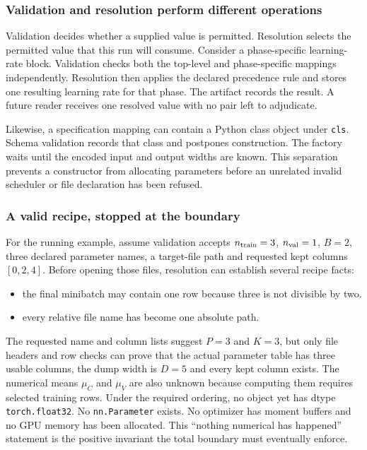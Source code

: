 \documentclass[10pt,aps,prd,twocolumn,nofootinbib]{revtex4-2}
\newcommand{\code}[1]{\texttt{#1}}
\begin{document}
\subsubsection{Validation and resolution perform different operations}

Validation decides whether a supplied value is permitted.  Resolution selects
the permitted value that this run will consume.  Consider a
phase-specific learning-rate block.  Validation checks both the top-level and
phase-specific mappings independently.  Resolution then applies the declared
precedence rule and stores one resulting learning rate for that phase.  The
artifact records the result.  A future reader receives one resolved value with
no pair left to adjudicate.

Likewise, a specification mapping can contain a Python class object under
\code{cls}.  Schema validation records that class and postpones construction.
The factory waits until the encoded input and output widths are known.  This
separation prevents a constructor from allocating parameters before an
unrelated invalid scheduler or file declaration has been refused.

\subsubsection{A valid recipe, stopped at the boundary}

For the running example, assume validation accepts $n_{\rm train}=3$,
$n_{\rm val}=1$, $B=2$, three declared parameter names, a target-file path
and requested kept columns $[0,2,4]$.  Before opening those files, resolution
can establish several recipe facts:
\begin{itemize}
  \item the final minibatch may contain one row because three is not divisible
        by two.
  \item every relative file name has become one absolute path.
\end{itemize}
The requested name and column lists suggest $P=3$ and $K=3$, but only file
headers and row checks can prove that the actual parameter table has three
usable columns, the dump width is $D=5$ and every kept column exists.  The
numerical means $\mu_C$ and $\mu_V$ are also unknown because computing them
requires selected training rows.  Under the required ordering, no object yet
has dtype \code{torch.float32}.  No \code{nn.Parameter} exists.  No optimizer
has moment buffers and no GPU memory has been allocated.  This ``nothing
numerical has happened'' statement is the positive invariant the total
boundary must eventually enforce.
\end{document}
